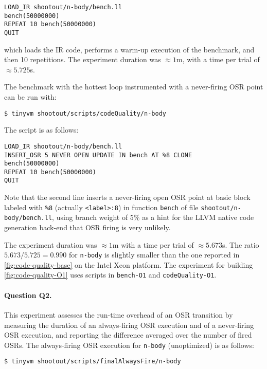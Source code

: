 \begin{small}
\begin{verbatim}
LOAD_IR shootout/n-body/bench.ll
bench(50000000)
REPEAT 10 bench(50000000)
QUIT
\end{verbatim}
\end{small}

\noindent which loads the IR code, performs a warm-up execution of the benchmark, and then 10 repetitions. The experiment duration was $\approx1$m, with a time per trial of $\approx5.725$s. 

The benchmark with the hottest loop instrumented with a never-firing OSR point can be run with:

\begin{small}
\begin{verbatim}
$ tinyvm shootout/scripts/codeQuality/n-body
\end{verbatim}
\end{small}

\noindent The script is as follows:

\begin{small}
\begin{verbatim}
LOAD_IR shootout/n-body/bench.ll
INSERT_OSR 5 NEVER OPEN UPDATE IN bench AT %8 CLONE
bench(50000000)
REPEAT 10 bench(50000000)
QUIT
\end{verbatim}
\end{small}

\noindent Note that the second line inserts a never-firing open OSR point at basic block labeled with {\tt \%8} (actually {\tt <label>:8}) in function {\tt bench} of file {\tt shootout/n-body/bench.ll}, using branch weight of 5\% as a hint for the LLVM native code generation back-end that OSR firing is very unlikely. 

The experiment duration was $\approx1$m with a time per trial of $\approx5.673$s. The ratio $5.673/5.725=0.990$ for {\tt n-body} is slightly smaller than the one reported in \ref{fig:code-quality-base} on the Intel Xeon platform. The experiment for building \ref{fig:code-quality-O1} uses scripts in {\tt bench-O1} and {\tt codeQuality-O1}.

\paragraph{Question Q2.} This experiment assesses the run-time overhead of an OSR transition by measuring the duration of an always-firing OSR execution and of a never-firing OSR execution, and reporting the difference averaged over the number of fired OSRs. The always-firing OSR execution for {\tt n-body} (unoptimized) is as follows:
\begin{small}
\begin{verbatim}
$ tinyvm shootout/scripts/finalAlwaysFire/n-body
\end{verbatim}
\end{small}

